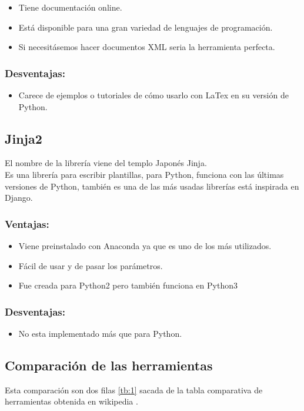 \begin{itemize}
\item Tiene documentación online.
\item Está disponible para una gran variedad de lenguajes de programación.
\item Si necesitásemos hacer documentos XML seria la herramienta perfecta.
\end{itemize}

\subsubsection{Desventajas:}
\begin{itemize}
\item Carece de ejemplos o tutoriales de cómo usarlo con LaTex en su versión de Python.
\end{itemize}


\subsection{Jinja2}

El nombre de la librería viene del templo Japonés Jinja.\\
Es una librería para escribir plantillas, para Python, funciona con las últimas versiones de Python, también es una de las más usadas librerías está inspirada en Django.


\subsubsection{Ventajas:}
\begin{itemize}
\item Viene preinstalado con Anaconda ya que es uno de los más utilizados.
\item Fácil de usar y de pasar los parámetros.
\item Fue creada para Python2 pero también funciona en Python3
\end{itemize}

\subsubsection{Desventajas:}
\begin{itemize}
\item No esta implementado más que para Python.
\end{itemize}

\subsection{Comparación de las herramientas}
Esta comparación son dos filas \ref{tb:1} sacada de la tabla comparativa de herramientas obtenida en wikipedia \cite{Template:table}.


